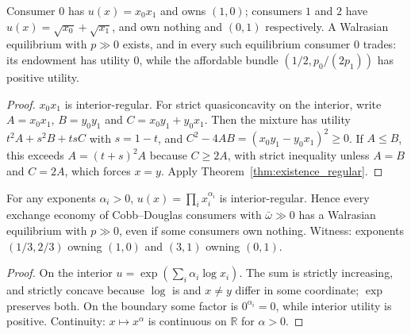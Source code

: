\begin{theorem}
\label{thm:cd_economy}
\leanok
{}
Consumer $0$ has $u(x) = x_0 x_1$ and owns $(1,0)$; consumers $1$ and $2$ have $u(x) = \sqrt{x_0} + \sqrt{x_1}$, and
own nothing and $(0,1)$ respectively. A Walrasian equilibrium with $p \gg 0$ exists, and in every such equilibrium
consumer $0$ trades: its endowment has utility $0$, while the affordable bundle $(1/2, p_0/(2p_1))$ has positive utility.
\end{theorem}
\begin{proof}
\leanok
$x_0x_1$ is interior-regular. For strict quasiconcavity on the interior, write $A = x_0x_1$, $B = y_0y_1$ and
$C = x_0y_1 + y_0x_1$. Then the mixture has utility $t^2A + s^2B + tsC$ with $s = 1 - t$, and
$C^2 - 4AB = (x_0y_1 - y_0x_1)^2 \ge 0$. If $A \le B$, this exceeds $A = (t+s)^2 A$ because $C \ge 2A$, with strict inequality
unless $A = B$ and $C = 2A$, which forces $x = y$. Apply Theorem~\ref{thm:existence_regular}.
\end{proof}

\begin{theorem}
\label{thm:cobb_douglas_existence}
\leanok
{}
For any exponents $\alpha_i > 0$, $u(x) = \prod_i x_i^{\alpha_i}$ is interior-regular. Hence every exchange economy of
Cobb--Douglas consumers with $\bar\omega \gg 0$ has a Walrasian equilibrium with $p \gg 0$, even if some consumers own
nothing. Witness: exponents $(1/3, 2/3)$ owning $(1,0)$ and $(3,1)$ owning $(0,1)$.
\end{theorem}
\begin{proof}
\leanok
On the interior $u = \exp(\sum_i \alpha_i \log x_i)$. The sum is strictly increasing, and strictly concave because $\log$
is and $x \ne y$ differ in some coordinate; $\exp$ preserves both. On the boundary some factor is $0^{\alpha_i} = 0$, while
interior utility is positive. Continuity: $x \mapsto x^{\alpha}$ is continuous on $\mathbb{R}$ for $\alpha > 0$.
\end{proof}

